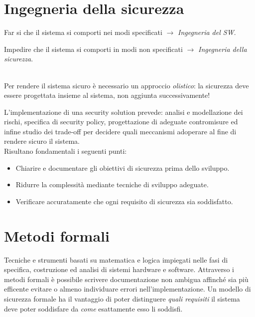 \documentclass[a4paper, 11pt, notitlepage, fleqn]{report}
\begin{document}
\section{Ingegneria della sicurezza}
\begin{minipage}{0.45\textwidth}
	Far si che il sistema si comporti nei modi specificati $\rightarrow$ \emph{Ingegneria del SW}.
\end{minipage}
\hfill
\begin{minipage}{0.48\textwidth}
	Impedire che il sistema si comporti in modi non specificati $\rightarrow$ \emph{Ingegneria della sicurezza}.
\end{minipage}\\[1em]
Per rendere il sistema sicuro è necessario un approccio \emph{olistico}: la sicurezza deve essere progettata insieme al sistema, non aggiunta successivamente!

L'implementazione di una security solution prevede: analisi e modellazione dei rischi, specifica di security policy, progettazione di adeguate contromisure ed infine studio dei trade-off per decidere quali meccanismi adoperare al fine di rendere sicuro il sistema.\\
Risultano fondamentali i seguenti punti:
\begin{itemize}
	\item Chiarire e documentare gli obiettivi di sicurezza prima dello sviluppo.
	\item Ridurre la complessità mediante tecniche di sviluppo adeguate.
	\item Verificare accuratamente che ogni requisito di sicurezza sia soddisfatto.
\end{itemize}

\section{Metodi formali}
Tecniche e strumenti basati su matematica e logica impiegati nelle fasi di specifica, costruzione ed analisi di sistemi hardware e software. Attraverso i metodi formali è possibile scrivere documentazione non ambigua affinché sia più efficente evitare o almeno individuare errori nell'implementazione. Un modello di sicurezza formale ha il vantaggio di poter distinguere \emph{quali requisiti} il sistema deve poter soddisfare da \emph{come} esattamente esso li soddisfi.


\end{document}
